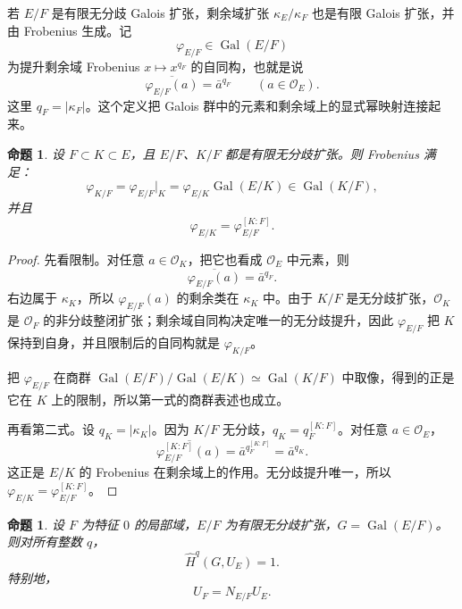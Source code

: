 \documentclass[11pt,a4paper,openany]{ctexbook}
\numberwithin{equation}{chapter}
\newcommand{\Gal}{\operatorname{Gal}}
\theoremstyle{plain}
\newtheorem{proposition}[theorem]{命题}
\theoremstyle{definition}
\theoremstyle{remark}
\begin{document}
若 $E/F$ 是有限无分歧 Galois 扩张，剩余域扩张 $\kappa_E/\kappa_F$ 也是有限 Galois 扩张，并由 Frobenius 生成。记
\[
\varphi_{E/F}\in\Gal(E/F)
\]
为提升剩余域 Frobenius $x\mapsto x^{q_F}$ 的自同构，也就是说
\[
\overline{\varphi_{E/F}(a)}=\bar a^{q_F}\qquad (a\in\mathcal O_E).
\]
这里 $q_F=|\kappa_F|$。这个定义把 Galois 群中的元素和剩余域上的显式幂映射连接起来。

\begin{proposition}
设 $F\subset K\subset E$，且 $E/F$、$K/F$ 都是有限无分歧扩张。则 Frobenius 满足：
\[
\varphi_{K/F}=\varphi_{E/F}|_K=\varphi_{E/K}\Gal(E/K)\in\Gal(K/F),
\]
并且
\[
\varphi_{E/K}=\varphi_{E/F}^{[K:F]}.
\]
\end{proposition}

\begin{proof}
先看限制。对任意 $a\in\mathcal O_K$，把它也看成 $\mathcal O_E$ 中元素，则
\[
\overline{\varphi_{E/F}(a)}=\bar a^{q_F}.
\]
右边属于 $\kappa_K$，所以 $\varphi_{E/F}(a)$ 的剩余类在 $\kappa_K$ 中。由于 $K/F$ 是无分歧扩张，$\mathcal O_K$ 是 $\mathcal O_F$ 的非分歧整闭扩张；剩余域自同构决定唯一的无分歧提升，因此 $\varphi_{E/F}$ 把 $K$ 保持到自身，并且限制后的自同构就是 $\varphi_{K/F}$。

把 $\varphi_{E/F}$ 在商群 $\Gal(E/F)/\Gal(E/K)\simeq\Gal(K/F)$ 中取像，得到的正是它在 $K$ 上的限制，所以第一式的商群表述也成立。

再看第二式。设 $q_K=|\kappa_K|$。因为 $K/F$ 无分歧，$q_K=q_F^{[K:F]}$。对任意 $a\in\mathcal O_E$，
\[
\overline{\varphi_{E/F}^{[K:F]}(a)}=\bar a^{q_F^{[K:F]}}=\bar a^{q_K}.
\]
这正是 $E/K$ 的 Frobenius 在剩余域上的作用。无分歧提升唯一，所以 $\varphi_{E/K}=\varphi_{E/F}^{[K:F]}$。
\end{proof}

\begin{proposition}
设 $F$ 为特征 $0$ 的局部域，$E/F$ 为有限无分歧扩张，$G=\Gal(E/F)$。则对所有整数 $q$，
\[
\widehat H^q(G,U_E)=1.
\]
特别地，
\[
U_F=N_{E/F}U_E.
\]
\end{proposition}
\end{document}
